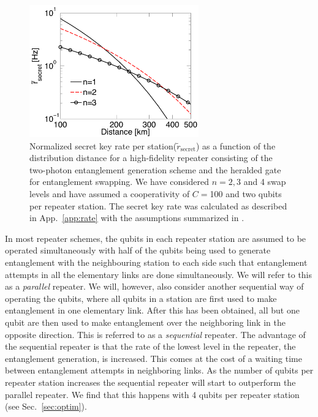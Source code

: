 \begin{figure} 
\centering
\includegraphics[width=0.65\textwidth]{./figs_Borregaard_PRA2015/figureX4}
\caption[Number of swap levels]{Normalized secret key rate per
station($\tilde{r}_{\text{secret}}$) as a function of the distribution distance
for a high-fidelity repeater consisting of the two-photon entanglement
generation scheme and the heralded gate for entanglement swapping.  We have
considered $n=2,3$ and 4 swap levels and have assumed a cooperativity of $C=$100
and two qubits per repeater station. The secret key rate was calculated as
described in App.~\ref{app:rate} with the assumptions summarized in
.  }
\label{fig:figureX4}
\end{figure} 
  
In most repeater schemes, the qubits in each repeater station are assumed to be
operated simultaneously with half of the qubits being used to generate
entanglement with the neighbouring station to each side such that entanglement
attempts in all the elementary links are done simultaneously. We will refer to
this as a \emph{parallel} repeater.  We will, however, also consider another
sequential way of operating the qubits, where all qubits in a station are first
used to make entanglement in one elementary link. After this has been obtained,
all but one qubit are then used to make entanglement over the neighboring link
in the opposite direction. This is referred to as a \emph{sequential} repeater.
The advantage of the sequential repeater is that the rate of the lowest level in
the repeater, the entanglement generation, is increased. This comes at the cost
of a waiting time between entanglement attempts in neighboring links. As the
number of qubits per repeater station increases the sequential repeater will
start to outperform the parallel repeater. We find that this happens with 4
qubits per repeater station (see Sec.~\ref{sec:optim}).

